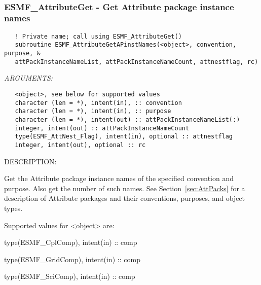    
 
\mbox{}\hrulefill\ 
 
\subsubsection [ESMF\_AttributeGet] {ESMF\_AttributeGet - Get Attribute package instance names}


  
\begin{verbatim}   ! Private name; call using ESMF_AttributeGet()
   subroutine ESMF_AttributeGetAPinstNames(<object>, convention, purpose, &
   attPackInstanceNameList, attPackInstanceNameCount, attnestflag, rc)\end{verbatim}{\em ARGUMENTS:}
\begin{verbatim}   <object>, see below for supported values
   character (len = *), intent(in), :: convention
   character (len = *), intent(in), :: purpose
   character (len = *), intent(out) :: attPackInstanceNameList(:)
   integer, intent(out) :: attPackInstanceNameCount
   type(ESMF_AttNest_Flag), intent(in), optional :: attnestflag
   integer, intent(out), optional :: rc\end{verbatim}
{\sf DESCRIPTION:\\ }


   Get the Attribute package instance names of the specified convention
   and purpose. Also get the number of such names.
   See Section~\ref{sec:AttPacks} for a description of Attribute packages
   and their conventions, purposes, and object types.
  
   Supported values for <object> are:
   \begin{description}
   \item type(ESMF\_CplComp), intent(in) :: comp
   \item type(ESMF\_GridComp), intent(in) :: comp
   \item type(ESMF\_SciComp), intent(in) :: comp
   \end{description}
  
